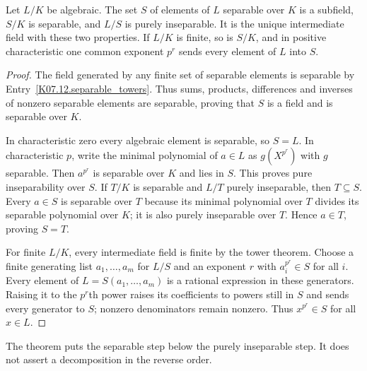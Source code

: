 \begin{theorem}
Let $L/K$ be algebraic. The set $S$ of elements of $L$ separable over $K$ is a subfield, $S/K$ is separable, and $L/S$ is purely inseparable. It is the unique intermediate field with these two properties. If $L/K$ is finite, so is $S/K$, and in positive characteristic one common exponent $p^r$ sends every element of $L$ into $S$.
\end{theorem}
\begin{proof}
The field generated by any finite set of separable elements is separable by Entry~\ref{K07.12.separable_towers}. Thus sums, products, differences and inverses of nonzero separable elements are separable, proving that $S$ is a field and is separable over $K$.

In characteristic zero every algebraic element is separable, so $S=L$. In characteristic $p$, write the minimal polynomial of $a\in L$ as $g(X^{p^r})$ with $g$ separable. Then $a^{p^r}$ is separable over $K$ and lies in $S$. This proves pure inseparability over $S$. If $T/K$ is separable and $L/T$ purely inseparable, then $T\subseteq S$. Every $a\in S$ is separable over $T$ because its minimal polynomial over $T$ divides its separable polynomial over $K$; it is also purely inseparable over $T$. Hence $a\in T$, proving $S=T$.

For finite $L/K$, every intermediate field is finite by the tower theorem. Choose a finite generating list $a_1,\ldots,a_m$ for $L/S$ and an exponent $r$ with $a_i^{p^r}\in S$ for all $i$. Every element of $L=S(a_1,\ldots,a_m)$ is a rational expression in these generators. Raising it to the $p^r$th power raises its coefficients to powers still in $S$ and sends every generator to $S$; nonzero denominators remain nonzero. Thus $x^{p^r}\in S$ for all $x\in L$.
\end{proof}
\begin{remark}
The theorem puts the separable step below the purely inseparable step. It does not assert a decomposition in the reverse order.
\end{remark}

